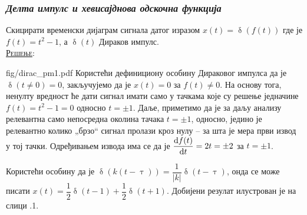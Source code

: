 \subsubsection{\textit{Делта импулс и хевисајднова одскочна функција}}
\noindent
\PID 
Скицирати временски дијаграм сигнала датог изразом $x(t) = \updelta(f(t))$ где је 
$f(t) = t^2 - 1$, а
$\updelta(t)$ Дираков импулс. \\[2mm]

\textsc{\underline{Решење}}: 

\begin{slikaDesno}
[1]
[$t^2 - 1$ (- - -), $\updelta(t^2 - 1)$ (---)]
{fig/dirac_pm1.pdf}
Користећи дефинициону особину Дираковог импулса да је $\updelta(t \neq 0) = 0$, 
закључујемо да је $x(t) = 0$ за $f(t) \neq 0$. На основу тога, ненулту вредност ће дати сигнал имати 
само у тачкама које су решење једначине $f(t) = t^2 - 1 = 0$ односно $t = \pm 1$.  
Даље, приметимо да је за даљу анализу релевантна само непосредна околина 
тачака $t = \pm 1$, односно, једино је релевантно колико „брзо“ сигнал пролази
кроз нулу -- за шта је мера први извод у тој тачки. Одређивањем извода  има се да је 
$\dfrac{{\rm d} f(t)}{{\rm d} t} = 2t = \pm 2$ за $t = \pm 1$. 
\end{slikaDesno}
Користећи особину да је $\updelta( k(t - \uptau) ) = \dfrac{1}{|k|} \updelta(t - \uptau)$, онда 
се може писати 
${x(t) = \dfrac12 \updelta(t - 1) + \dfrac12 \updelta(t + 1)}$. Добијени резулат илустрован је на слици 
\ID.1. 